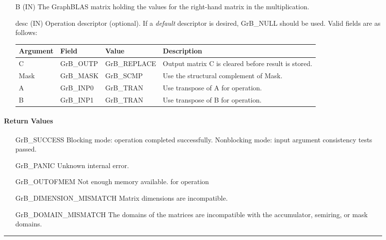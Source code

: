 \begin{figure*}[ht!]
\begin{itemize}[leftmargin=1.1in]
    \item[{\sf B}] ({\sf IN}) The GraphBLAS matrix holding the values
    for the right-hand matrix in the multiplication.

    \item[{\sf desc}] ({\sf IN}) Operation descriptor (optional). If
    a \emph{default} descriptor is desired, {\sf GrB\_NULL} should be
    used. Valid fields are as follows: 

    \begin{tabular}{lllp{2.75in}}
    Argument   & Field           & Value               & Description \\ \hline
    {\sf C}    & {\sf GrB\_OUTP} & {\sf GrB\_REPLACE}  & Output matrix {\sf C} is cleared before result is stored. \\
    {\sf Mask} & {\sf GrB\_MASK} & {\sf GrB\_SCMP}     & Use the structural complement of {\sf Mask}. \\
    {\sf A}    & {\sf GrB\_INP0} & {\sf GrB\_TRAN}     & Use transpose of {\sf A} for operation. \\
    {\sf B}    & {\sf GrB\_INP1} & {\sf GrB\_TRAN}     & Use transpose of {\sf B} for operation. \\
    \end{tabular}
\end{itemize}

\paragraph{Return Values}

\begin{itemize}[leftmargin=2.1in]

	\item[{\sf GrB\_SUCCESS}]	Blocking mode: operation
	completed successfully. Nonblocking mode: input argument consistency tests
	passed.  

	\item[{\sf GrB\_PANIC}]		      Unknown internal error.

	\item[{\sf GrB\_OUTOFMEM}]	      Not enough memory available.
	for operation

	\item[{\sf GrB\_DIMENSION\_MISMATCH}] Matrix dimensions are
	incompatible.

	\item[{\sf GrB\_DOMAIN\_MISMATCH}]    The domains of the matrices are incompatible with the 
	accumulator, semiring, or mask domains.

\end{itemize}

\hrule
\end{figure*}
